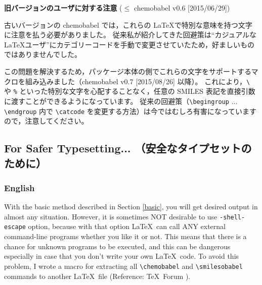 \documentclass[12pt]{jsarticle}
\begin{document}
\noindent \textbf{旧バージョンのユーザに対する注意} ($\le$ \textsf{chemobabel} v0.6 [2015/06/29])

古いバージョンの \textsf{chemobabel} では，これらの \LaTeX で特別な意味を持つ文字に注意を払う必要がありました。
従来私が紹介してきた回避策は“カジュアルな \LaTeX ユーザ”にカテゴリーコードを手動で変更させていたため，好ましいものではありませんでした。

この問題を解決するため，パッケージ本体の側でこれらの文字をサポートするマクロを組み込みました（\textsf{chemobabel} v0.7 [2015/08/26] 以降）。
これにより，\verb|\| や \verb|%| といった特別な文字を心配することなく，任意の SMILES 表記を直接引数に渡すことができるようになっています。
従来の回避策（\verb|\begingroup| ... \verb|\endgroup| 内で \verb|\catcode| を変更する方法）は今ではむしろ有害になっていますので，注意してください。

\clearpage

\subsection{For Safer Typesetting... （安全なタイプセットのために）} \label{extract}

\subsubsection{English}

With the basic method described in Section \ref{basic}, you will get desired output in almost any situation.
However, it is sometimes NOT desirable to use \verb|-shell-escape| option,
because with that option \LaTeX\ can call ANY external command-line programs whether you like it or not.
This means that there is a chance for unknown programs to be executed,
and this can be dangerous especially in case that you don't write your own \LaTeX\ code.
To avoid this problem, I wrote a macro for extracting all \verb|\chemobabel| and \verb|\smilesobabel| commands to another \LaTeX\ file (Reference: \TeX\ Forum \cite{OKU}).
\end{document}

